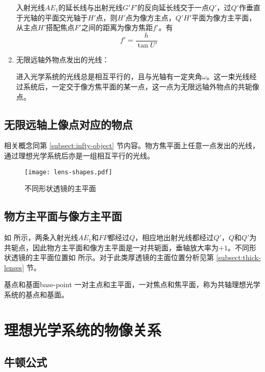 \documentclass[cn,10pt,chinesefont=founder,math=newtx,cite=super,twoside]{elegantbook}
\begin{document}
\begin{enumerate}
	入射光线$AE_1$的延长线与出射光线$G'F'$的反向延长线交于一点$Q'$，过$Q'$作垂直于光轴的平面交光轴于$H'$点，则$H'$点为像方主点，$Q'H'$平面为像方主平面，从主点$H'$搭配焦点$F'$之间的距离为像方焦距$f'$。有
	\begin{equation}
		f'=\frac{h}{\tan U'}
	\end{equation}
	
	\item 无限远轴外物点发出的光线：
	
	进入光学系统的光线总是相互平行的，且与光轴有一定夹角$\omega$。这一束光线经过系统后，一定交于像方焦平面的某一点，这一点为无限远轴外物点的共轭像点。	
\end{enumerate}

\subsection{无限远轴上像点对应的物点}
相关概念同第 \ref{subsect:infty-object} 节内容。物方焦平面上任意一点发出的光线，通过理想光学系统后亦是一组相互平行的光线。

\begin{figure}[htbp]
	\centering
	\texttt{[image: lens-shapes.pdf]}
	\caption{不同形状透镜的主平面}
	\label{fig:lens-shapes}
\end{figure}

\subsection{物方主平面与像方主平面}
\label{subsect:base-point}
如 所示，两条入射光线$AE_1$和$FP$都经过$Q$，相应地出射光线都经过$Q'$，$Q$和$Q'$为共轭点，因此物方主平面和像方主平面是一对共轭面，垂轴放大率为$+1$。不同形状透镜的主平面位置如 所示。对于此类厚透镜的主面位置分析见第 \ref{subsect:thick-lenses} 节。

\begin{definition}{基点和基面}{base-point}
	一对主点和主平面，一对焦点和焦平面，称为共轴理想光学系统的基点和基面。
\end{definition}

\section{理想光学系统的物像关系}
\subsection{牛顿公式}
\end{document}
